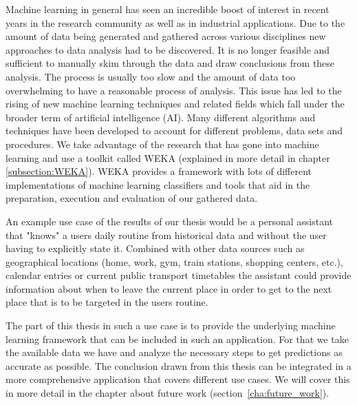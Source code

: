 Machine learning in general has seen an incredible boost of interest in recent years in the research community as well as in industrial applications. Due to the amount of data being generated and gathered across various disciplines new approaches to data analysis had to be discovered. It is no longer feasible and sufficient to manually skim through the data and draw conclusions from these analysis. The process is usually too slow and the amount of data too overwhelming to have a reasonable process of analysis. This issue has led to the rising of new machine learning techniques and related fields which fall under the broader term of artificial intelligence (AI). Many different algorithms and techniques have been developed to account for different problems, data sets and procedures. We take advantage of the research that has gone into machine learning and use a toolkit called WEKA (explained in more detail in chapter \ref{subsection:WEKA}). WEKA provides a framework with lots of different implementations of machine learning classifiers and tools that aid in the preparation, execution and evaluation of our gathered data.

An example use case of the results of our thesis would be a personal assistant that "knows" a users daily routine from historical data and without the user having to explicitly state it. Combined with other data sources such as geographical locations (home, work, gym, train stations, shopping centers, etc.), calendar entries or current public transport timetables the assistant could provide information about when to leave the current place in order to get to the next place that is to be targeted in the users routine. 

The part of this thesis in such a use case is to provide the underlying machine learning framework that can be included in such an application. For that we take the available data we have and analyze the necessary steps to get predictions as accurate as possible. The conclusion drawn from this thesis can be integrated in a more comprehensive application that covers different use cases. We will cover this in more detail in the chapter about future work (section~\ref{cha:future_work}).
